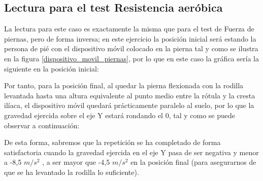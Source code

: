 \subsection{Lectura para el test Resistencia aeróbica}

La lectura para este caso es exactamente la misma que para el test de Fuerza de piernas, pero de forma inversa; en este ejercicio la posición inicial será estando la persona de pié con el dispositivo móvil colocado en la pierna tal y como se ilustra en la figura \ref{dispositivo_movil_piernas}, por lo que en este caso la gráfica sería la siguiente en la posición inicial:


Por tanto, para la posición final, al quedar la pierna flexionada con la rodilla levantada hasta una altura equivalente al punto medio entre la rótula y la cresta ilíaca, el dispositivo móvil quedará prácticamente paralelo al suelo, por lo que la gravedad ejercida sobre el eje Y estará rondando el 0, tal y como se puede observar a continuación:


De esta forma, sabremos que la repetición se ha completado de forma satisfactoria cuando la gravedad ejercida en el eje Y pasa de ser negativa y menor a -8,5 $m/s^{2}$ , a ser mayor que -4,5 $m/s^{2}$ en la posición final (para asegurarnos de que se ha levantado la rodilla lo suficiente).
